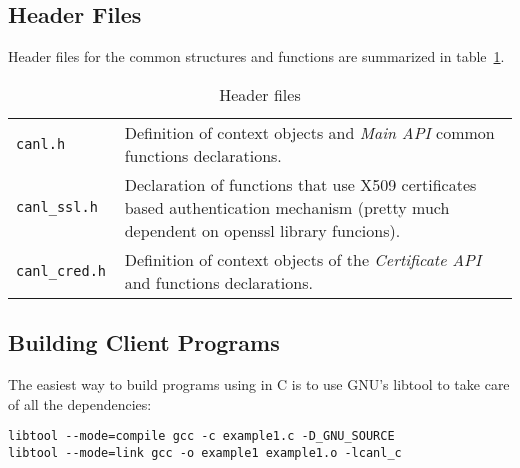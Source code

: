 \subsection{Header Files}

Header files for the common structures and functions are summarized in
table~\ref{t:cheaders}.

\begin{table}[h]
\begin{tabularx}{\textwidth}{>{\tt}lX}
canl.h & Definition of context objects and \textit{Main API} common 
functions declarations. \\
canl\_ssl.h & Declaration of functions that use X509 certificates 
based authentication mechanism (pretty much dependent on 
openssl library funcions).\\
canl\_cred.h & Definition of context objects of the 
\textit{Certificate API}  and  functions declarations.\\
\end{tabularx}
\caption{Header files}
\label{t:cheaders}
\end{table}

\subsection{Building Client Programs}
The easiest way to build programs using \CANL in C is to use
GNU's libtool to take care of all the dependencies:
\begin{verbatim}
libtool --mode=compile gcc -c example1.c -D_GNU_SOURCE
libtool --mode=link gcc -o example1 example1.o -lcanl_c
\end{verbatim}

